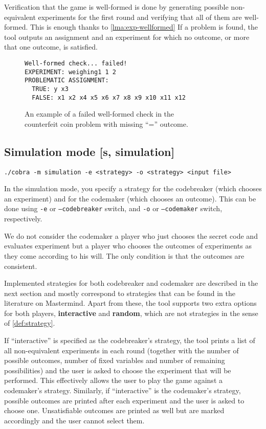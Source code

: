 Verification that the game is well-formed is done by
  generating possible non-equivalent experiments for the first round
  and verifying that all of them are well-formed.
This is enough thanks to \autoref{lma:exp-wellformed}
If a problem is found, the tool outputs an assignment and an experiment
  for which no outcome, or more that one outcome, is satisfied.

\begin{figure}
\begin{lstlisting}[xleftmargin=.2\textwidth]
Well-formed check... failed!
EXPERIMENT: weighing1 1 2
PROBLEMATIC ASSIGNMENT:
  TRUE: y x3
  FALSE: x1 x2 x4 x5 x6 x7 x8 x9 x10 x11 x12
\end{lstlisting}
\caption{An example of a failed well-formed check in the\\ counterfeit coin problem
 with missing ``='' outcome.}
\end{figure}

\subsection{Simulation mode [s, simulation]}

\centerline{\texttt{./cobra -m simulation -e <strategy> -o <strategy> <input file> }}

In the simulation mode, you specify a strategy for
  the codebreaker (which chooses an experiment) and for the codemaker
   (which chooses an outcome).
This can be done using \texttt{-e} or \texttt{--codebreaker} switch, and
\texttt{-o} or \texttt{--codemaker} switch, respectively.

We do not consider the codemaker a player who just chooses the secret code
and evaluates experiment but a player who chooses the outcomes
of experiments as they come according to his will.
The only condition is that the outcomes are consistent.

Implemented strategies for both codebreaker and codemaker
  are described in the next section and mostly correspond to strategies
  that can be found in the literature on Mastermind.
Apart from these, the tool supports two extra options for both players,
  \textbf{interactive} and \textbf{random},
  which are not strategies in the sense of \autoref{def:strategy}.

If ``interactive'' is specified as the codebreaker's strategy,
  the tool prints a list of all non-equivalent experiments in each round
  (together with the number of possible outcomes, number of fixed variables
  and number of remaining possibilities) and the user is asked
  to choose the experiment that will be performed.
This effectively allows the user to play the game against a codemaker's strategy.
Similarly, if ``interactive'' is the codemaker's strategy, possible outcomes
  are printed after each experiment and the user is asked to choose one.
Unsatisfiable outcomes are printed as well but are marked accordingly
  and the user cannot select them.

